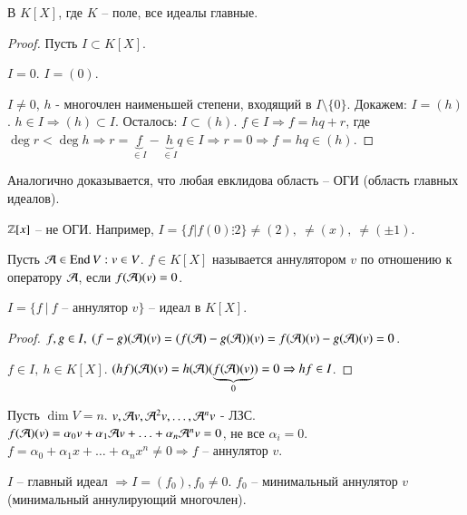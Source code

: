 \documentclass[main]{subfiles}
\begin{document}
\begin{corollary}
    В $K[X]$, где $K$ -- поле, все идеалы главные.
\end{corollary}

\begin{proof}
    Пусть $I \subset K[X]$.

    $I = 0$. $I = (0)$.

    $I \neq 0 $, $h$ - многочлен наименьшей степени, входящий в $I\setminus \{0\}$.
    Докажем: $I = (h)$. $h \in I \Rightarrow (h) \subset I$.
    Осталось: $I \subset (h)$. $f \in I \Rightarrow f=hq+r$, где $\deg r < \deg h
        \Rightarrow r = \underbrace{f}_{\in I} - \underbrace{h}_{\in I} q \in I \Rightarrow r = 0 \Rightarrow f = hq \in (h)$.
\end{proof}

\begin{remark}
    Аналогично доказывается, что любая евклидова область -- ОГИ (область главных идеалов).
\end{remark}

\begin{remark}
    $\mathbb{Z}[x]$ -- не ОГИ. Например, $I = \{f|f(0) \vdots 2\} \neq (2),\ \neq (x),\ \neq (\pm 1)$.
\end{remark}

\begin{definition} [Аннулятор]
    Пусть $\mathcal{A} \in \operatorname{End} V : v\in V$. $f \in K[X]$ называется аннулятором $v$ по отношению к оператору $\mathcal{A}$, если $f(\mathcal{A})(v) = 0$.
\end{definition}

\begin{lemma}
    $I = \{f \ | \ f$ -- аннулятор $v \}$ -- идеал в $K[X]$.
\end{lemma}

\begin{proof}
    $f, g \in I,\ (f-g)(\mca)(v) = (f(\mca)-g(\mca))(v) = f(\mca)(v) - g(\mca)(v) = 0$.

    $f \in I,\ h \in K[X]$. $(hf)(\mathcal{A})(v) = h(\mathcal{A})(\underbrace{f(\mathcal{A})(v)}_{0}) = 0 \Rightarrow hf \in I$.
\end{proof}

Пусть $\dim V = n$. $v, \mathcal{A} v, {\mathcal{A}}^2 v, \ldots, {\mathcal{A}}^n v$ - ЛЗС.
$f(\mathcal{A})(v) = \alpha_0 v + \alpha_1 \mathcal{A} v + \ldots + \alpha_n {\mathcal{A}}^n v = 0$, не все $\alpha_i =0$.
$f = \alpha_0 + \alpha_1 x + \ldots + \alpha_n x^n \neq 0 \Rightarrow f$ -- аннулятор $v$.

$I$ -- главный идеал $\Rightarrow I=(f_0), f_0 \neq 0$. $f_0$ -- минимальный аннулятор $v$ (минимальный аннулирующий многочлен).
\end{document}
